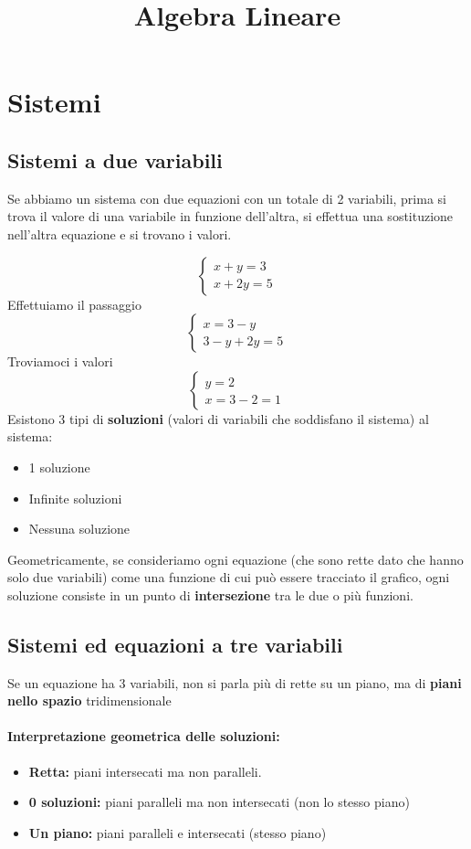 \documentclass[12pt,a4paper]{article}
\title{Algebra Lineare}
\author{}
\date{}
\let\oldsection\section
\renewcommand{\section}{\clearpage\oldsection}
\begin{document}
\maketitle
\tableofcontents

\section{Sistemi}
\subsection{Sistemi a due variabili}
Se abbiamo un sistema con due equazioni con un totale di 2 variabili, prima si trova il valore di una variabile in funzione dell'altra, si effettua una sostituzione nell'altra equazione e si trovano i valori.

\[
\begin{cases}
x + y = 3 \\
x + 2y = 5
\end{cases}
\]
Effettuiamo il passaggio
\[
\begin{cases}
  x = 3 - y \\
  3 - y + 2y = 5
\end{cases}
\]
Troviamoci i valori
\[
\begin{cases}
  y = 2 \\
  x = 3 - 2 = 1
\end{cases}
\]
Esistono 3 tipi di \textbf{soluzioni} (valori di variabili che soddisfano il sistema) al sistema:
\begin{itemize}
  \item 1 soluzione
  \item Infinite soluzioni
  \item Nessuna soluzione
\end{itemize}
Geometricamente, se consideriamo ogni equazione (che sono rette dato che hanno solo due variabili) come una funzione di cui può essere tracciato il grafico,
ogni soluzione consiste in un punto di \textbf{intersezione} tra le due o più funzioni.

\subsection{Sistemi ed equazioni a tre variabili}
Se un equazione ha 3 variabili, non si parla più di rette su un piano, ma di \textbf{piani nello spazio} tridimensionale
\paragraph{Interpretazione geometrica delle soluzioni:}
\begin{itemize}
  \item \textbf{Retta:} piani intersecati ma non paralleli.
  \item \textbf{0 soluzioni:} piani paralleli ma non intersecati (non lo stesso piano)
  \item \textbf{Un piano:} piani paralleli e intersecati (stesso piano)
\end{itemize}
\end{document}
